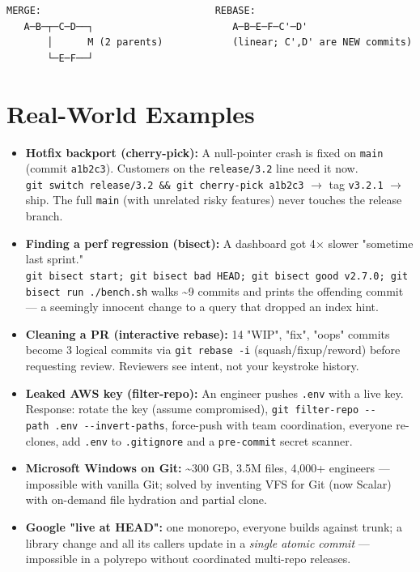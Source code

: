 \documentclass[11pt]{article}
\providecommand{\tightlist}{\setlength{\itemsep}{1pt}\setlength{\parskip}{0pt}}
\begin{document}
\setcodelang{}

\begin{verbatim}
MERGE:                              REBASE:
   A─B─┬─C─D──┐                        A─B─E─F─C'─D'
       │      M (2 parents)            (linear; C',D' are NEW commits)
       └─E─F──┘
\end{verbatim}

\section{Real-World Examples}\label{real-world-examples}

\begin{itemize}
\tightlist
\item
  \textbf{Hotfix backport (cherry-pick):} A null-pointer crash is fixed on \texttt{main} (commit \texttt{a1b2c3}). Customers on the \texttt{release/3.2} line need it now. \texttt{git\ switch\ release/3.2\ \&\&\ git\ cherry-pick\ a1b2c3} \(\rightarrow\) tag \texttt{v3.2.1} \(\rightarrow\) ship. The full \texttt{main} (with unrelated risky features) never touches the release branch.
\item
  \textbf{Finding a perf regression (bisect):} A dashboard got 4\(\times\) slower "sometime last sprint." \texttt{git\ bisect\ start;\ git\ bisect\ bad\ HEAD;\ git\ bisect\ good\ v2.7.0;\ git\ bisect\ run\ ./bench.sh} walks \textasciitilde9 commits and prints the offending commit --- a seemingly innocent change to a query that dropped an index hint.
\item
  \textbf{Cleaning a PR (interactive rebase):} 14 "WIP", "fix", "oops" commits become 3 logical commits via \texttt{git\ rebase\ -i} (squash/fixup/reword) before requesting review. Reviewers see intent, not your keystroke history.
\item
  \textbf{Leaked AWS key (filter-repo):} An engineer pushes \texttt{.env} with a live key. Response: rotate the key (assume compromised), \texttt{git\ filter-repo\ -\/-path\ .env\ -\/-invert-paths}, force-push with team coordination, everyone re-clones, add \texttt{.env} to \texttt{.gitignore} and a \texttt{pre-commit} secret scanner.
\item
  \textbf{Microsoft Windows on Git:} \textasciitilde300 GB, 3.5M files, 4,000+ engineers --- impossible with vanilla Git; solved by inventing VFS for Git (now Scalar) with on-demand file hydration and partial clone.
\item
  \textbf{Google "live at HEAD":} one monorepo, everyone builds against trunk; a library change and all its callers update in a \emph{single atomic commit} --- impossible in a polyrepo without coordinated multi-repo releases.
\end{itemize}
\end{document}
